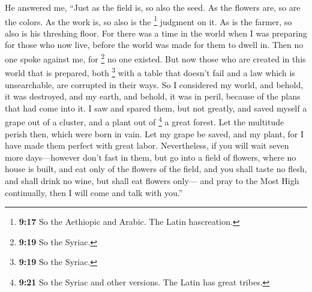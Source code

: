  He answered me, ``Just as the field is, so also the
seed. As the flowers are, so are the colors. As the work is, so also is
the \footnote{\textbf{9:17} So the Aethiopic and Arabic. The Latin
  hascreation.} judgment on it. As is the farmer, so also is his
threshing floor. For there was a time in the world  when
I was preparing for those who now live, before the world was made for
them to dwell in. Then no one spoke against me,  for
\footnote{\textbf{9:19} So the Syriac.} no one existed. But now those
who are created in this world that is prepared, both \footnote{\textbf{9:19}
  So the Syriac.} with a table that doesn't fail and a law which is
unsearchable, are corrupted in their ways.  So I
considered my world, and behold, it was destroyed, and my earth, and
behold, it was in peril, because of the plans that had come into it.
 I saw and spared them, but not greatly, and saved myself
a grape out of a cluster, and a plant out of \footnote{\textbf{9:21} So
  the Syriac and other versions. The Latin has great tribes.} a great
forest.  Let the multitude perish then, which were born
in vain. Let my grape be saved, and my plant, for I have made them
perfect with great labor.  Nevertheless, if you will wait
seven more days---however don't fast in them,  but go
into a field of flowers, where no house is built, and eat only of the
flowers of the field, and you shall taste no flesh, and shall drink no
wine, but shall eat flowers only---  and pray to the Most
High continually, then I will come and talk with you.''

